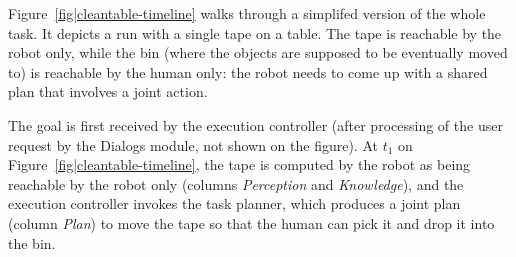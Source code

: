 \documentclass[preprint,3p,times]{elsarticle}
\newcommand{\action}[3]{#1\\\textsf{\scriptsize #2,}\\\textsf{\scriptsize #3}}
\begin{document}
%
%
%
%
%
%
%
%
%
%
%

Figure~\ref{fig|cleantable-timeline} walks through a simplifed version of the whole
task. It depicts a run with a single tape on a table. The tape is
reachable by the robot only, while the bin (where the objects are supposed to be
eventually moved to) is reachable by the human only: the robot needs to come up
with a shared plan that involves a joint action.

The goal is first received by the execution controller (after processing of the
user request by the {\sc Dialogs} module, not shown on the figure). At $t_1$ on
Figure~\ref{fig|cleantable-timeline}, the tape is computed by the robot as being
reachable by the robot only (columns \emph{Perception} and \emph{Knowledge}),
and the execution controller invokes the task planner, which produces a joint
plan (column \emph{Plan}) to move the tape so that the human can pick it and
drop it into the bin.
\end{document}
